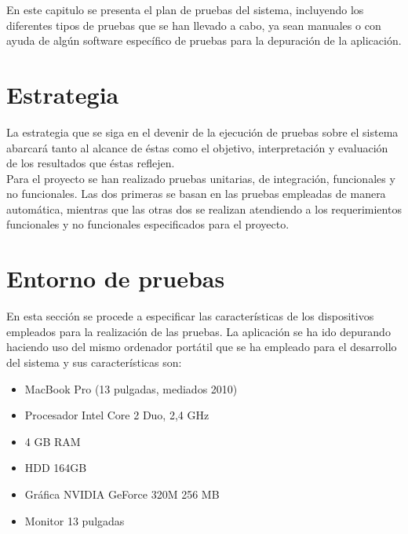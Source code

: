 

En este capitulo se presenta el plan de pruebas del sistema, incluyendo los diferentes tipos de pruebas que se han llevado a cabo, ya sean manuales o con ayuda de algún software específico de pruebas para la depuración de la aplicación.

\section{Estrategia}

La estrategia que se siga en el devenir de la ejecución de pruebas sobre el sistema abarcará tanto al alcance de éstas como el objetivo, interpretación y evaluación de los resultados que éstas reflejen.\\

Para el proyecto se han realizado pruebas unitarias, de integración, funcionales y no funcionales. Las dos primeras se basan en las pruebas empleadas de manera automática, mientras que las otras dos se realizan atendiendo a los requerimientos funcionales y no funcionales especificados para el proyecto.

\section{Entorno de pruebas}

En esta sección se procede a especificar las características de los dispositivos empleados para la realización de las pruebas. La aplicación se ha ido depurando haciendo uso del mismo ordenador portátil que se ha empleado para el desarrollo del sistema y sus características son:

\begin{itemize}
\item MacBook Pro (13 pulgadas, mediados 2010)
\item Procesador Intel Core 2 Duo, 2,4 GHz
\item 4 GB RAM
\item HDD 164GB
\item Gráfica NVIDIA GeForce 320M 256 MB
\item Monitor 13 pulgadas
\end{itemize}


